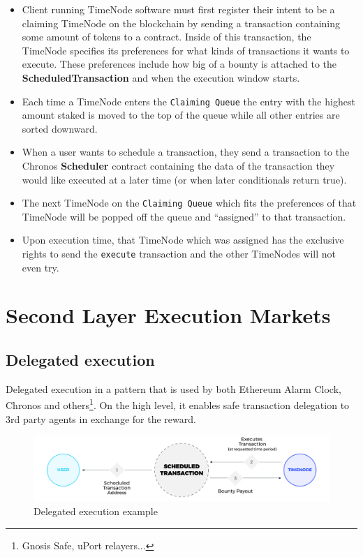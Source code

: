 \documentclass{report}
\begin{document}
  \begin{itemize}
    \item Client running TimeNode software must first register their intent to be a claiming TimeNode on the blockchain by sending a transaction containing some amount of tokens to a contract. Inside of this transaction, the TimeNode specifies its preferences for what kinds of transactions it wants to execute. These preferences include how big of a bounty is attached to the \textbf{ScheduledTransaction} and when the execution window starts.
    \item Each time a TimeNode enters the \texttt{Claiming Queue} the entry with the highest amount staked is moved to the top of the queue while all other entries are sorted downward.
    \item When a user wants to schedule a transaction, they send a transaction to the Chronos \textbf{Scheduler} contract containing the data of the transaction they would like executed at a later time (or when later conditionals return true).
    \item The next TimeNode on the \texttt{Claiming Queue} which fits the preferences of that TimeNode will be popped off the queue and “assigned” to that transaction.
    \item Upon execution time, that TimeNode which was assigned has the exclusive rights to send the \texttt{execute} transaction and the other TimeNodes will not even try.
  \end{itemize}

  \chapter{Second Layer Execution Markets}
  \section{Delegated execution}
  Delegated execution in a pattern that is used by both Ethereum Alarm Clock, Chronos and others\footnote{Gnosis Safe, uPort relayers...}. On the high level, it enables safe transaction delegation to 3rd party agents in exchange for the reward.

  \begin{figure}[h]
    \includegraphics[width=\textwidth]{delegated_execution}
    \caption{Delegated execution example}
  \end{figure}
\end{document}
